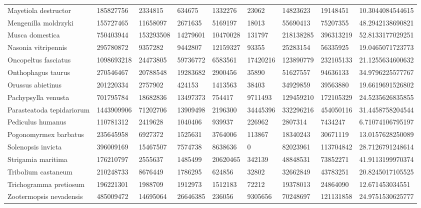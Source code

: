 \begin{table}[]
\begin{tabular}{@{}lllllllll@{}}
Mayetiola destructor       & 185827756   & 2334815   & 634675    & 1332276   & 23062     & 14823623   & 19148451   & 10.3044084544615  \\
Mengenilla moldrzyki       & 155727465   & 11658097  & 2671635   & 5169197   & 18013     & 55690413   & 75207355   & 48.2942138690821  \\
Musca domestica            & 750403944   & 153293508 & 14279601  & 10470028  & 131797    & 218138285  & 396313219  & 52.8133177029251  \\
Nasonia vitripennis        & 295780872   & 9357282   & 9442807   & 12159327  & 93355     & 25283154   & 56335925   & 19.0465071723773  \\
Oncopeltus fasciatus       & 1098693218  & 24473805  & 59736772  & 6583561   & 17420216  & 123890779  & 232105133  & 21.1255634600632  \\
Onthophagus taurus         & 270546467   & 20788548  & 19283682  & 2900456   & 35890     & 51627557   & 94636133   & 34.9796225577767  \\
Orussus abietinus          & 201220334   & 2757902   & 424153    & 1413563   & 38403     & 34929859   & 39563880   & 19.6619691526802  \\
Pachypsylla venusta        & 701795784   & 18682836  & 13497373  & 754417    & 9711493   & 129459210  & 172105329  & 24.5235626835855  \\
Parasteatoda tepidariorum  & 1443909906  & 71202706  & 13909498  & 2196300   & 34445396  & 332296216  & 454050116  & 31.4458758204544  \\
Pediculus humanus          & 110781312   & 2419628   & 1040406   & 939937    & 226962    & 2807314    & 7434247    & 6.71074106795197  \\
Pogonomyrmex barbatus      & 235645958   & 6927372   & 1525631   & 3764006   & 113867    & 18340243   & 30671119   & 13.0157628250089  \\
Solenopsis invicta         & 396009169   & 15467507  & 7574738   & 8638636   & 0         & 82023961   & 113704842  & 28.7126791248614  \\
Strigamia maritima         & 176210797   & 2555637   & 1485499   & 20620465  & 342139    & 48848531   & 73852271   & 41.9113199970374  \\
Tribolium castaneum        & 210248733   & 8676449   & 1786295   & 624856    & 32802     & 32662849   & 43783251   & 20.8245017105525  \\
Trichogramma pretiosum     & 196221301   & 1988709   & 1912973   & 1512183   & 72212     & 19378013   & 24864090   & 12.671453034551   \\
Zootermopsis nevadensis    & 485009472   & 14695064  & 26646385  & 236056    & 9305656   & 70248697   & 121131858  & 24.9751530625777  \\ \bottomrule
\end{tabular}
\end{table}

